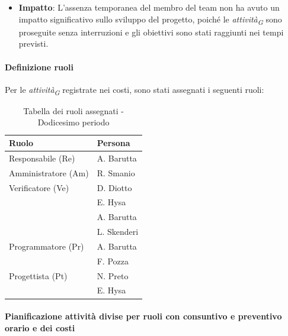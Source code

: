 \begin{itemize}
\begin{itemize}
\begin{itemize}
                    \item \textbf{Impatto}: L'assenza temporanea del membro del team non ha avuto un impatto significativo sullo sviluppo del progetto, poiché le \textit{attività}\textsubscript{\textit{G}} sono proseguite senza interruzioni e gli obiettivi sono stati raggiunti nei tempi previsti.
                \end{itemize}
        \end{itemize}
\end{itemize}

\paragraph{Definizione ruoli}
Per le \textit{attività}\textsubscript{\textit{G}} registrate nei costi, sono stati assegnati i seguenti ruoli: 

\begin{table}[H]
    \centering
    \begin{tabular}{|L{4cm}|L{2cm}|}
        \hline
        \textbf{Ruolo} & \textbf{Persona} \\
        \hline
        \hline
        Responsabile (Re)   & A. Barutta \\
        \hline
        Amministratore (Am) & R. Smanio \\
        \hline
        Verificatore (Ve)   & D. Diotto \\
                            & E. Hysa \\
                            & A. Barutta \\
                            & L. Skenderi \\ 
        \hline
        Programmatore (Pr)  & A. Barutta \\
                            & F. Pozza \\
        \hline
        Progettista (Pt)    & N. Preto \\
                            & E. Hysa \\
        \hline
    \end{tabular}
    \caption{Tabella dei ruoli assegnati - Dodicesimo periodo}
    \label{tab:Ruoli_persone_12}
\end{table}

\paragraph{Pianificazione attività divise per ruoli con consuntivo e preventivo orario e dei costi}

